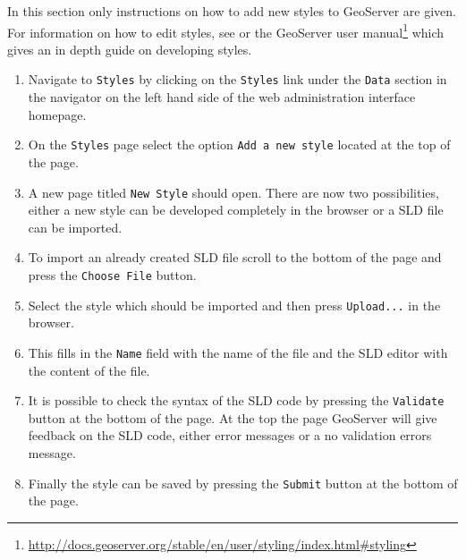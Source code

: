 In this section only instructions on how to add new styles to GeoServer are
given. For information on how to edit styles, see 
or the GeoServer user
manual\footnote{\url{http://docs.geoserver.org/stable/en/user/styling/index.html\#styling}}
which gives an in depth guide on developing styles.

\begin{enumerate}
	\item Navigate to \lstinline|Styles| by clicking on the \lstinline|Styles| link under the \lstinline|Data| section in the navigator on the left hand side of the web administration interface homepage.
	\item On the \lstinline|Styles| page select the option \lstinline|Add a new style| located at the top of the page.
	\item A new page titled \lstinline|New Style| should open. There are now two possibilities, either a new style can be developed completely in the browser or a SLD file can be imported.
	\item To import an already created SLD file scroll to the bottom of the page and press the \lstinline|Choose File| button.
	\item Select the style which should be imported and then press \lstinline|Upload...| in the browser.
	\item This fills in the \lstinline|Name| field with the name of the file and the SLD editor with the content of the file.
	\item It is possible to check the syntax of the SLD code by pressing the \lstinline|Validate| button at the bottom of the page. At the top the page GeoServer will give feedback on the SLD code, either error messages or a no validation errors message.
	\item Finally the style can be saved by pressing the \lstinline|Submit| button at the bottom of the page.
\end{enumerate}
